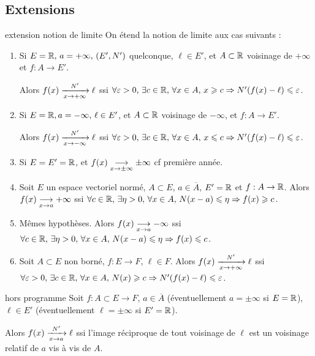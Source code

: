 \subsection{Extensions }

\begin{definition}{extension notion de limite}{}
    On étend la notion de limite aux cas suivants : 
    \begin{enumerate}
        \item Si $E = \R, \, a = + \infty, \, (E', N')$ quelconque, $\ell \in E'$, et $A \subset \R$ 
            voisinage de $+ \infty$ et $f : A \to E'$.

            Alors $f(x) \limitnorme{N'}{x}{+ \infty} \ell$ ssi $\forall \varepsilon > 0, \, \exists c \in \R, \, \forall x \in A, \, x \geqslant c \Rightarrow N'(f(x) - \ell) \leqslant \varepsilon$.

        \item Si $E = \R, a = - \infty, \, \ell \in E'$, et $A \subset \R$ voisinage de $- \infty$, et $f : A \to E'$.

            Alors $f(x) \limitnorme{N'}{x}{- \infty} \ell$ ssi $\forall \varepsilon > 0, \, \exists c \in \R, \, \forall x \in A, \, x \leqslant c \Rightarrow N'(f(x) - \ell) \leqslant \varepsilon$.
        
        \item Si $E = E' = \R$, et $f(x) \limit x {\pm \infty} \pm \infty$ cf première année. 
        \item Soit $E$ un espace vectoriel normé, $A \subset E$, $a \in \overline A$, $E' = \R$ et $f: A \to \R$. Alors 
            $f(x) \limit x a + \infty$ ssi $\forall c \in \R, \, \exists \eta > 0, \, \forall x \in A, \, N(x - a) \leqslant \eta \Rightarrow f(x) \geqslant c$.

        \item Mêmes hypothèses. Alors $f(x) \limit x a - \infty$ ssi $\forall c \in \R, \, \exists \eta > 0, \, \forall x \in A, \, N(x - a) \leqslant \eta \Rightarrow f(x) \leqslant c$.
        \item Soit $A \subset E$ non borné, $f : E \to F, \, \ell \in F$. Alors $f(x) \limitnorme{N'}{x}{+ \infty} \ell$ ssi $\forall \varepsilon > 0, \, \exists c \in \R, \, \forall x \in A, \, N(x) \geqslant c \Rightarrow N'(f(x) - \ell) \leqslant \varepsilon$.
    \end{enumerate}
\end{definition}

\begin{theoreme}{hors programme}{}
    Soit $f : A \subset E \to F$, $a \in \overline A$ (éventuellement $a = \pm \infty$ si $E = \R$), 
    $\ell \in E'$ (éventuellement $\ell = \pm \infty$ si $E' = \R$).

    Alors $f(x) \limitnorme{N'}{x}{a} \ell$ ssi l'image réciproque de tout voisinage de 
    $\ell$ est un voisinage relatif de $a$ vis à vis de $A$.
\end{theoreme}


